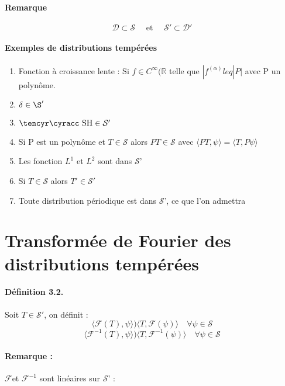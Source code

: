 \documentclass[12pt,a4paper]{report}
\newcommand{\ens}[1]{\ensuremath{\mathbb{#1}}}
\newcommand{\D}{\ensuremath{\mathcal{D}}}
\newcommand{\F}{\ensuremath{\mathcal{F}}}
\newcommand{\Sf}{\ensuremath{\mathcal{S}}}
\def\cyr{\tencyr\cyracc}
\def\dc{\mbox{\cyr SH}}
\begin{document}
\paragraph{Remarque}

\[
	\D \subset \Sf \quad \text{ et } \quad \Sf' \subset \D'
\]

\paragraph{Exemples de distributions tempérées}

\begin{enumerate}
	\item Fonction à croissance lente : Si \(f \in C^\infty (\ens{R}\) telle que \(|f^{(\alpha)} leq |P|\) avec P un polynôme.
	\item \(\delta \in \S'\)
	\item \(\dc \in \Sf'\)
	\item Si P est un polynôme et \(T \in \Sf\) alors \(PT \in \Sf\) avec \(\langle PT, \psi \rangle = \langle T, P \psi \rangle\)
	\item Les fonction \(L^1\) et \(L^2\) sont dans \Sf'
	\item Si \(T \in \Sf\) alors \(T' \in \Sf'\)
	\item Toute distribution périodique est dans \Sf', ce que l'on admettra
\end{enumerate}

\section{Transformée de Fourier des distributions tempérées}

\paragraph{Définition 3.2.} Soit \(T \in \Sf'\), on définit :
\[
	\langle \F(T), \psi \rangle ) \langle T, \F(\psi) \rangle \quad \forall \psi \in \Sf
\]
\[
	\langle \F^{-1}(T), \psi \rangle ) \langle T, \F^{-1}(\psi) \rangle \quad \forall \psi \in \Sf
\]

\paragraph{Remarque :} \F et \(\F^{-1}\) sont linéaires sur \Sf' :
\end{document}
